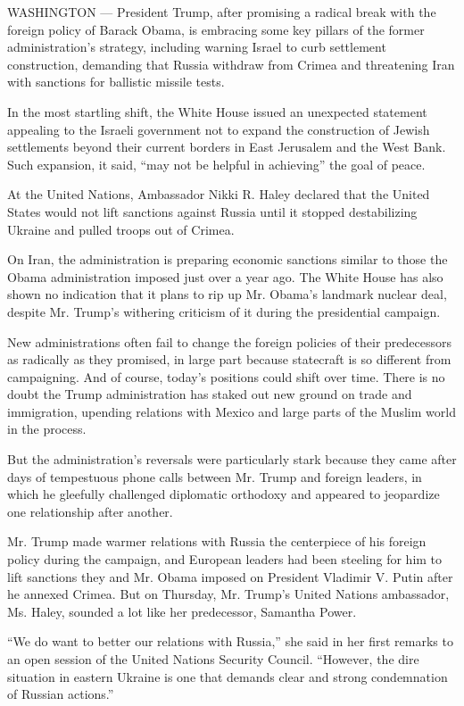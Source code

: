 WASHINGTON --- President Trump, after promising a radical break with the
foreign policy of Barack Obama, is embracing some key pillars of the
former administration's strategy, including warning Israel to curb
settlement construction, demanding that Russia withdraw from Crimea and
threatening Iran with sanctions for ballistic missile tests.

In the most startling shift, the White House issued an unexpected
statement appealing to the Israeli government not to expand the
construction of Jewish settlements beyond their current borders in East
Jerusalem and the West Bank. Such expansion, it said, ``may not be
helpful in achieving'' the goal of peace.

At the United Nations, Ambassador Nikki R. Haley declared that the
United States would not lift sanctions against Russia until it stopped
destabilizing Ukraine and pulled troops out of Crimea.

On Iran, the administration is preparing economic sanctions similar to
those the Obama administration imposed just over a year ago. The White
House has also shown no indication that it plans to rip up Mr. Obama's
landmark nuclear deal, despite Mr. Trump's withering criticism of it
during the presidential campaign.

New administrations often fail to change the foreign policies of their
predecessors as radically as they promised, in large part because
statecraft is so different from campaigning. And of course, today's
positions could shift over time. There is no doubt the Trump
administration has staked out new ground on trade and immigration,
upending relations with Mexico and large parts of the Muslim world in
the process.

But the administration's reversals were particularly stark because they
came after days of tempestuous phone calls between Mr. Trump and foreign
leaders, in which he gleefully challenged diplomatic orthodoxy and
appeared to jeopardize one relationship after another.

Mr. Trump made warmer relations with Russia the centerpiece of his
foreign policy during the campaign, and European leaders had been
steeling for him to lift sanctions they and Mr. Obama imposed on
President Vladimir V. Putin after he annexed Crimea. But on Thursday,
Mr. Trump's United Nations ambassador, Ms. Haley, sounded a lot like her
predecessor, Samantha Power.

``We do want to better our relations with Russia,'' she said in her
first remarks to an open session of the United Nations Security Council.
``However, the dire situation in eastern Ukraine is one that demands
clear and strong condemnation of Russian actions.''

